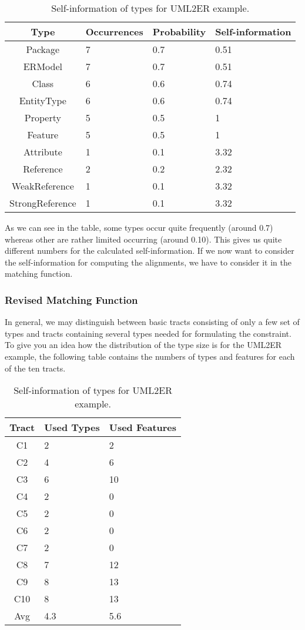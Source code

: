 \begin{table}[t]
\centering
\caption{Self-information of types for UML2ER example.}
\begin{tabular}{|c|l|l|l|} \hline
Type&Occurrences&Probability&Self-information\\ \hline
Package & 	7 &	0.7	&0.51 \\ \hline
ERModel & 	7 &	0.7	&0.51 \\ \hline
Class & 	6 &	0.6	&0.74 \\ \hline
EntityType & 	6	& 0.6	& 0.74 \\ \hline
Property &	5	& 0.5	& 1 \\ \hline
Feature &	5	&0.5	& 1 \\ \hline
Attribute &	1	&0.1	& 3.32 \\ \hline
Reference & 	2	&0.2	& 2.32 \\ \hline
WeakReference & 	1	&0.1	& 3.32 \\ \hline
StrongReference & 	1	&0.1	& 3.32\\ \hline
\end{tabular}
\label{tab:SelfInformation}
\end{table}

As we can see in the table, some types occur quite frequently (around 0.7) whereas other are rather limited occurring (around 0.10). This gives us quite different numbers for the calculated self-information. If we now want to consider the self-information for computing the alignments, we have to consider it in the matching function.

\subsubsection{Revised Matching Function}

In general, we may distinguish between basic tracts consisting of only a few set of types and tracts containing several types needed for formulating the constraint. To give you an idea how the distribution of the type size is for the UML2ER example, the following table contains the numbers of types and features for each of the ten tracts.

\begin{table}[t]
\centering
\caption{Self-information of types for UML2ER example.}
\begin{tabular}{|c|l|l|} \hline
Tract&Used Types&Used Features\\ \hline
C1	& 2	& 2\\ \hline
C2	& 4	& 6\\ \hline
C3	& 6	& 10\\ \hline
C4	& 2	& 0\\ \hline
C5	& 2	& 0\\ \hline
C6	& 2	& 0\\ \hline
C7	& 2	& 0\\ \hline
C8	& 7	& 12\\ \hline
C9	& 8	& 13\\ \hline
C10	& 8	& 13\\ \hline\hline
Avg	& 4.3 & 5.6\\\hline
\end{tabular}
\label{tab:Family2PersonExample}
\end{table}


